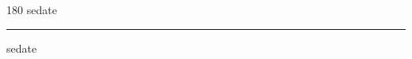 
\begin{frame}
\begin{center}
\begin{turn}{180}
{\fontsize{2.5cm}{1em}\selectfont sedate}
\end{turn}
\vspace{1em}\par  
\hrule
\vspace{1em}\par  
{\fontsize{2.5cm}{1em}\selectfont sedate}
\end{center}
\end{frame}
